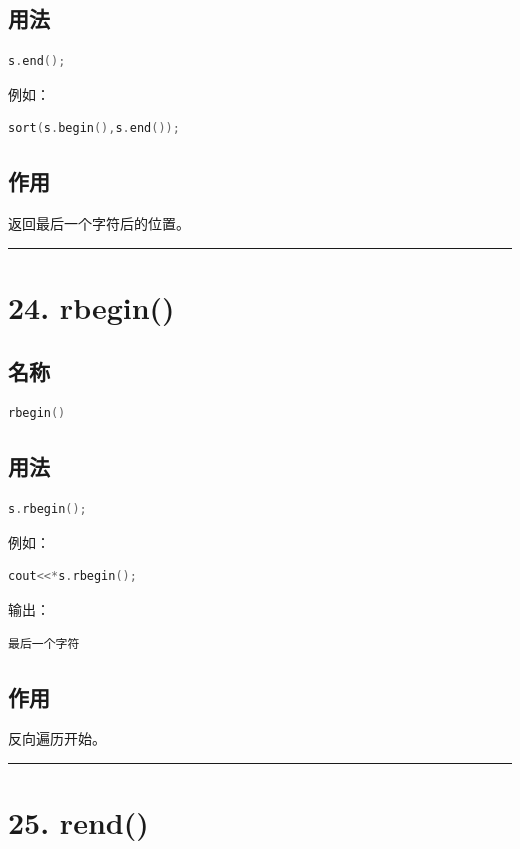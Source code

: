 \documentclass[10pt,twocolumn]{extarticle}
\begin{document}
\subsection{用法}
\begin{lstlisting}[language=C++]
s.end();
\end{lstlisting}
例如：
\begin{lstlisting}[language=C++]
sort(s.begin(),s.end());
\end{lstlisting}

\subsection{作用}
返回最后一个字符后的位置。

\noindent\rule{\linewidth}{0.4pt}

\section{24. rbegin()}

\subsection{名称}
\begin{lstlisting}[language=C++]
rbegin()
\end{lstlisting}

\subsection{用法}
\begin{lstlisting}[language=C++]
s.rbegin();
\end{lstlisting}
例如：
\begin{lstlisting}[language=C++]
cout<<*s.rbegin();
\end{lstlisting}
输出：
\begin{lstlisting}
最后一个字符
\end{lstlisting}

\subsection{作用}
反向遍历开始。

\noindent\rule{\linewidth}{0.4pt}

\section{25. rend()}
\end{document}
